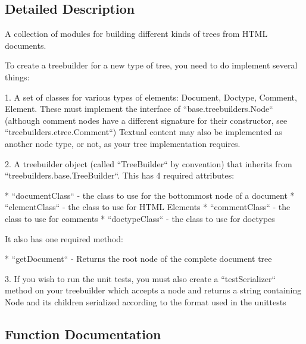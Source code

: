 \subsection{Detailed Description}
\begin{DoxyVerb}A collection of modules for building different kinds of trees from HTML
documents.

To create a treebuilder for a new type of tree, you need to do
implement several things:

1. A set of classes for various types of elements: Document, Doctype, Comment,
   Element. These must implement the interface of ``base.treebuilders.Node``
   (although comment nodes have a different signature for their constructor,
   see ``treebuilders.etree.Comment``) Textual content may also be implemented
   as another node type, or not, as your tree implementation requires.

2. A treebuilder object (called ``TreeBuilder`` by convention) that inherits
   from ``treebuilders.base.TreeBuilder``. This has 4 required attributes:

   * ``documentClass`` - the class to use for the bottommost node of a document
   * ``elementClass`` - the class to use for HTML Elements
   * ``commentClass`` - the class to use for comments
   * ``doctypeClass`` - the class to use for doctypes

   It also has one required method:

   * ``getDocument`` - Returns the root node of the complete document tree

3. If you wish to run the unit tests, you must also create a ``testSerializer``
   method on your treebuilder which accepts a node and returns a string
   containing Node and its children serialized according to the format used in
   the unittests\end{DoxyVerb}
 

\subsection{Function Documentation}
\mbox{\label{namespacepip_1_1__vendor_1_1html5lib_1_1treebuilders_a127aeb9dfbb8079a4ec65284e191d81c}} 
